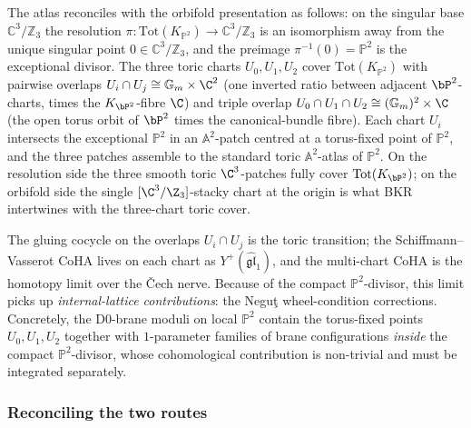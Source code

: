 The atlas reconciles with the orbifold presentation as follows: on the singular base $\mathbb{C}^3/\mathbb{Z}_3$ the resolution $\pi : \mathrm{Tot}(K_{\mathbb{P}^2}) \to \mathbb{C}^3/\mathbb{Z}_3$ is an isomorphism away from the unique singular point $0 \in \mathbb{C}^3/\mathbb{Z}_3$, and the preimage $\pi^{-1}(0) = \mathbb{P}^2$ is the exceptional divisor. The three toric charts $U_0, U_1, U_2$ cover $\mathrm{Tot}(K_{\mathbb{P}^2})$ with pairwise overlaps $U_i \cap U_j \cong \mathbb{G}_m \times \C^2$ (one inverted ratio between adjacent $\bP^2$-charts, times the $K_{\bP^2}$-fibre $\C$) and triple overlap $U_0 \cap U_1 \cap U_2 \cong (\mathbb{G}_m)^2 \times \C$ (the open torus orbit of $\bP^2$ times the canonical-bundle fibre). Each chart $U_i$ intersects the exceptional $\mathbb{P}^2$ in an $\mathbb{A}^2$-patch centred at a torus-fixed point of $\mathbb{P}^2$, and the three patches assemble to the standard toric $\mathbb{A}^2$-atlas of $\mathbb{P}^2$. On the resolution side the three smooth toric $\C^3$-patches fully cover $\mathrm{Tot}(K_{\bP^2})$; on the orbifold side the single $[\C^3/\Z_3]$-stacky chart at the origin is what BKR intertwines with the three-chart toric cover.

The gluing cocycle on the overlaps $U_i \cap U_j$ is the toric transition; the Schiffmann--Vasserot CoHA lives on each chart as $Y^+(\widehat{\mathfrak{gl}}_1)$, and the multi-chart CoHA is the homotopy limit over the \v{C}ech nerve. Because of the compact $\mathbb{P}^2$-divisor, this limit picks up \emph{internal-lattice contributions}: the Negu\c{t} wheel-condition corrections. Concretely, the D0-brane moduli on local $\mathbb{P}^2$ contain the torus-fixed points $U_0, U_1, U_2$ together with $1$-parameter families of brane configurations \emph{inside} the compact $\mathbb{P}^2$-divisor, whose cohomological contribution is non-trivial and must be integrated separately.

\subsubsection{Reconciling the two routes}
\label{subsec:reconcile-p2}

